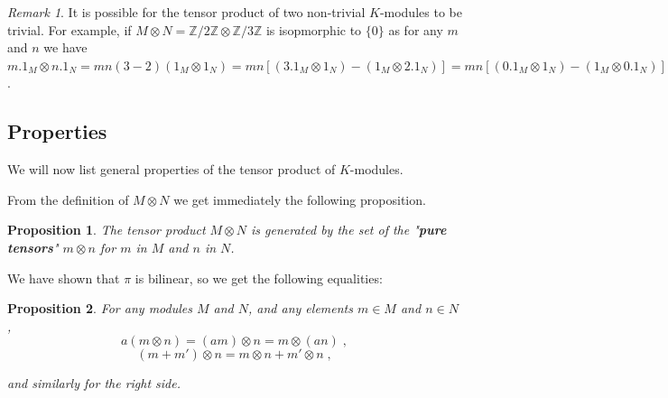\documentclass{report}
\newtheorem{prop}{Proposition}
\theoremstyle{definition}
\theoremstyle{remark}
\newtheorem{remark}{Remark}
\begin{document}


\begin{remark}
It is possible for the tensor product of two non-trivial $K$-modules to be trivial. For example, if $M \otimes N=\mathbb{Z}/2\mathbb{Z} \otimes \mathbb{Z}/3\mathbb{Z}$ is isopmorphic to $\{0\}$ as for any $m$ and $n$ we have
$m.1_M \otimes n.1_N= mn (3-2)(1_M \otimes 1_N)=mn [(3.1_M \otimes 1_N)-(1_M \otimes 2.1_N)]=
mn[(0.1_M \otimes 1_N)-(1_M \otimes 0.1_N)]=mn[0(1_M \otimes 1_N)-0(1_M \otimes 1_N)=0_{M \otimes N}$.
    
\end{remark}

    \subsection{Properties}
    
    We will now list general properties of the tensor product of $K$-modules. 
  
  \bigskip 
   From the definition of $M \otimes N$ we get immediately the following proposition.
    
    \begin{prop}
     The tensor product $M \otimes N$ is generated by the set of the "\textbf{pure tensors}" $m\otimes n$ for $m$ in $M$ and $n$ in $N$.   
    \end{prop}
    
    \bigskip
    We have shown that $\pi$ is bilinear, so we get the following equalities: 
  \begin{prop}
    For any modules $M$ and $N$, and any elements $m \in M$ and $n \in N$, 
    $$a(m\otimes n)= (am)\otimes n = m \otimes (an)\;,$$
    $$(m+m')\otimes n = m \otimes n + m' \otimes n\;,$$ 
    
    and similarly for the right side. 
      
  \end{prop}  
    
\end{document}

